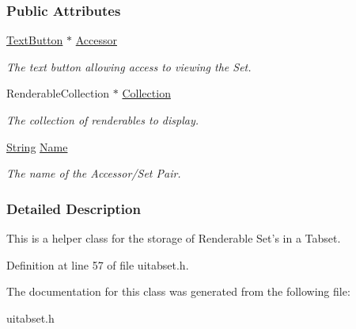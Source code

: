 \subsubsection*{Public Attributes}
\begin{DoxyCompactItemize}
\item 
\hypertarget{structMezzanine_1_1UI_1_1RenderableSetData_a748d426667cc79f9d9abbbdeeaf1c742}{
\hyperlink{classMezzanine_1_1UI_1_1TextButton}{TextButton} $\ast$ \hyperlink{structMezzanine_1_1UI_1_1RenderableSetData_a748d426667cc79f9d9abbbdeeaf1c742}{Accessor}}
\label{structMezzanine_1_1UI_1_1RenderableSetData_a748d426667cc79f9d9abbbdeeaf1c742}

\begin{DoxyCompactList}\small\item\em The text button allowing access to viewing the Set. \item\end{DoxyCompactList}\item 
\hypertarget{structMezzanine_1_1UI_1_1RenderableSetData_a35dddda517f77cbbb31eea781d7f9874}{
RenderableCollection $\ast$ \hyperlink{structMezzanine_1_1UI_1_1RenderableSetData_a35dddda517f77cbbb31eea781d7f9874}{Collection}}
\label{structMezzanine_1_1UI_1_1RenderableSetData_a35dddda517f77cbbb31eea781d7f9874}

\begin{DoxyCompactList}\small\item\em The collection of renderables to display. \item\end{DoxyCompactList}\item 
\hypertarget{structMezzanine_1_1UI_1_1RenderableSetData_a0e3c6ae9e62b7ab042613a3934d3d16a}{
\hyperlink{namespaceMezzanine_acf9fcc130e6ebf08e3d8491aebcf1c86}{String} \hyperlink{structMezzanine_1_1UI_1_1RenderableSetData_a0e3c6ae9e62b7ab042613a3934d3d16a}{Name}}
\label{structMezzanine_1_1UI_1_1RenderableSetData_a0e3c6ae9e62b7ab042613a3934d3d16a}

\begin{DoxyCompactList}\small\item\em The name of the Accessor/Set Pair. \item\end{DoxyCompactList}\end{DoxyCompactItemize}


\subsubsection{Detailed Description}
This is a helper class for the storage of Renderable Set's in a Tabset. 

Definition at line 57 of file uitabset.h.



The documentation for this class was generated from the following file:\begin{DoxyCompactItemize}
\item 
uitabset.h\end{DoxyCompactItemize}
